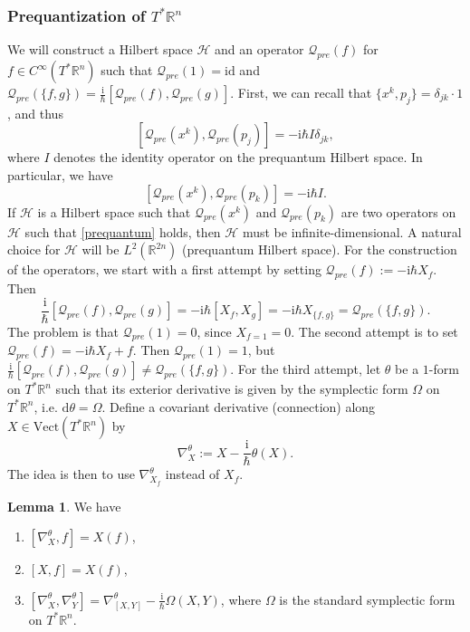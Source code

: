 \documentclass[11pt]{amsart}
\numberwithin{equation}{section}
\theoremstyle{plain}
\theoremstyle{definition}
\newtheorem{lem}{Lemma}[subsection]
\theoremstyle{remark}
\newcommand{\R}{\mathbb{R}}
\newcommand{\dd}{{\mathrm{d}}}
\newcommand{\id}{\mathrm{id}}
\newcommand{\calH}{\mathcal{H}}
\newcommand{\I}{\mathrm{i}}
\begin{document}
\subsubsection{Prequantization of $T^*\R^n$}
We will construct a Hilbert space $\calH$ and an operator $\mathscr{Q}_{pre}(f)$ for $f\in C^\infty(T^*\R^n)$ such that $\mathscr{Q}_{pre}(1)=\id$ and $\mathscr{Q}_{pre}(\{f,g\})=\frac{\I}{\hbar}[\mathscr{Q}_{pre}(f),\mathscr{Q}_{pre}(g)]$. First, we can recall that $\{ x^k,p_j\}=\delta_{jk}\cdot 1$, and thus $$[\mathscr{Q}_{pre}(x^k),\mathscr{Q}_{pre}(p_j)]=-\I\hbar I\delta_{jk},$$ 
where $I$ denotes the identity operator on the prequantum Hilbert space. In particular, we have
\begin{equation}
\label{prequantum}
[\mathscr{Q}_{pre}(x^k),\mathscr{Q}_{pre}(p_k)]=-\I\hbar I.
\end{equation}
If $\calH$ is a Hilbert space such that $\mathscr{Q}_{pre}(x^k)$ and $\mathscr{Q}_{pre}(p_k)$ are two operators on $\calH$ such that \eqref{prequantum} holds, then $\calH$ must be infinite-dimensional. A natural choice for $\calH$ will be $L^2(\R^{2n})$ (prequantum Hilbert space). For the construction of the operators, we start with a first attempt by setting $\mathscr{Q}_{pre}(f):=-\I\hbar X_f$. Then 
\[
\frac{\I}{\hbar}[\mathscr{Q}_{pre}(f),\mathscr{Q}_{pre}(g)]=-\I\hbar[X_f,X_g]=-\I\hbar X_{\{f,g\}}=\mathscr{Q}_{pre}(\{f,g\}).
\]
The problem is that $\mathscr{Q}_{pre}(1)=0$, since $X_{f=1}=0$. The second attempt is to set $\mathscr{Q}_{pre}(f)=-\I\hbar X_f+f$. Then $\mathscr{Q}_{pre}(1)=1$, but $\frac{\I}{\hbar}[\mathscr{Q}_{pre}(f),\mathscr{Q}_{pre}(g)]\not=\mathscr{Q}_{pre}(\{f,g\})$. For the third attempt, let $\theta$ be a $1$-form on $T^*\R^n$ such that its exterior derivative is given by the symplectic form $\Omega$ on $T^*\R^n$, i.e. $\dd\theta=\Omega$. Define a covariant derivative (connection) along $X\in \mathrm{Vect}(T^*\R^n)$ by $$\nabla_X^\theta:=X-\frac{\I}{\hbar}\theta(X).$$
The idea is then to use $\nabla_{X_f}^\theta$ instead of $X_f$. 
\begin{lem}
We have 
\begin{enumerate}
\item{$[\nabla_X^\theta,f]=X(f)$,}
\item{$[X,f]=X(f)$,}
\item{$[\nabla_X^\theta,\nabla_Y^\theta]=\nabla^\theta_{[X,Y]}-\frac{\I}{\hbar}\Omega(X,Y)$, where $\Omega$ is the standard symplectic form on $T^*\R^n$.
}
\end{enumerate}
\end{lem}
\end{document}
